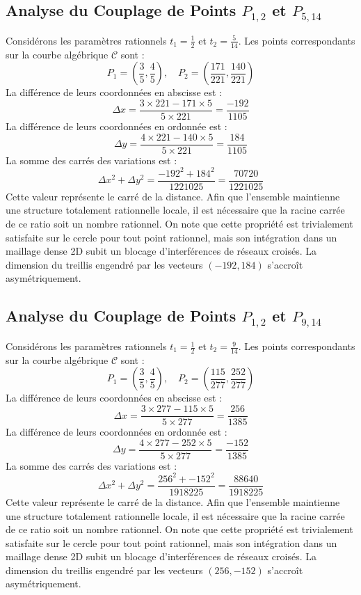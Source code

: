 \documentclass[12pt, a4paper]{article}
\begin{document}
\subsection{Analyse du Couplage de Points $P_{1,2}$ et $P_{5,14}$}
Considérons les paramètres rationnels $t_1 = \frac{1}{2}$ et $t_2 = \frac{5}{14}$.
Les points correspondants sur la courbe algébrique $\mathcal{C}$ sont :
$$ P_1 = \left( \frac{3}{5}, \frac{4}{5} \right), \quad P_2 = \left( \frac{171}{221}, \frac{140}{221} \right) $$
La différence de leurs coordonnées en abscisse est :
$$ \Delta x = \frac{3 \times 221 - 171 \times 5}{5 \times 221} = \frac{-192}{1105} $$
La différence de leurs coordonnées en ordonnée est :
$$ \Delta y = \frac{4 \times 221 - 140 \times 5}{5 \times 221} = \frac{184}{1105} $$
La somme des carrés des variations est :
$$ \Delta x^2 + \Delta y^2 = \frac{ -192^2 + 184^2 }{ 1221025 } = \frac{ 70720 }{ 1221025 } $$
Cette valeur représente le carré de la distance. Afin que l'ensemble maintienne une structure totalement rationnelle locale, il est nécessaire que la racine carrée de ce ratio soit un nombre rationnel. On note que cette propriété est trivialement satisfaite sur le cercle pour tout point rationnel, mais son intégration dans un maillage dense 2D subit un blocage d'interférences de réseaux croisés. La dimension du treillis engendré par les vecteurs $( -192, 184 )$ s'accroît asymétriquement.


\subsection{Analyse du Couplage de Points $P_{1,2}$ et $P_{9,14}$}
Considérons les paramètres rationnels $t_1 = \frac{1}{2}$ et $t_2 = \frac{9}{14}$.
Les points correspondants sur la courbe algébrique $\mathcal{C}$ sont :
$$ P_1 = \left( \frac{3}{5}, \frac{4}{5} \right), \quad P_2 = \left( \frac{115}{277}, \frac{252}{277} \right) $$
La différence de leurs coordonnées en abscisse est :
$$ \Delta x = \frac{3 \times 277 - 115 \times 5}{5 \times 277} = \frac{256}{1385} $$
La différence de leurs coordonnées en ordonnée est :
$$ \Delta y = \frac{4 \times 277 - 252 \times 5}{5 \times 277} = \frac{-152}{1385} $$
La somme des carrés des variations est :
$$ \Delta x^2 + \Delta y^2 = \frac{ 256^2 + -152^2 }{ 1918225 } = \frac{ 88640 }{ 1918225 } $$
Cette valeur représente le carré de la distance. Afin que l'ensemble maintienne une structure totalement rationnelle locale, il est nécessaire que la racine carrée de ce ratio soit un nombre rationnel. On note que cette propriété est trivialement satisfaite sur le cercle pour tout point rationnel, mais son intégration dans un maillage dense 2D subit un blocage d'interférences de réseaux croisés. La dimension du treillis engendré par les vecteurs $( 256, -152 )$ s'accroît asymétriquement.
\end{document}
